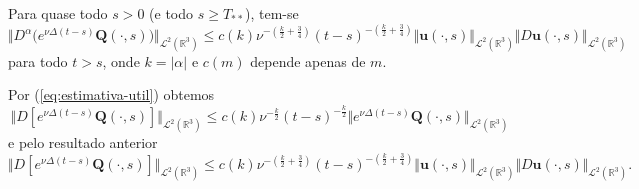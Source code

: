 \documentclass[a4paper, 11pt]{book}
\theoremstyle{definition}
\newcommand{\bR}{\mathbb{R}}
\newcommand{\bu}{\mathbf{u}}
\newcommand{\BQ}{\mathbf{Q}}
\newcommand{\cL}{\mathcal{L}}
\begin{document}
\begin{pbox}
    Para quase todo $s > 0$ (e todo $s \geqslant T_{**}$), tem-se
    \[
        \Vert D^{\alpha} \big( e^{\nu\Delta(t-s)}\BQ(\cdot,s)\big) \Vert_{\cL^2(\bR^3)} \leqslant c(k) \nu^{-\left( \frac{k}{2} + \frac{3}{4} \right)} (t - s)^{-\left( \frac{k}{2} + \frac{3}{4}\right)} \Vert \bu(\cdot,s) \Vert_{\cL^2(\bR^3)} \Vert D\bu(\cdot,s) \Vert_{\cL^2(\bR^3)}
    \]
    para todo $t > s$, onde $k = |\alpha|$ e $c(m)$ depende apenas de $m$.
\end{pbox}
\begin{prf}
    Por (\ref{eq:estimativa-util}) obtemos
    \[
        \Vert D [e^{\nu \Delta (t - s)} \BQ(\cdot,s)] \Vert_{\cL^2(\bR^3)} \leqslant c(k) \nu^{-\frac{k}{2}} (t - s)^{-\frac{k}{2}} \Vert e^{\nu\Delta(t-s)} \BQ(\cdot,s) \Vert_{\cL^2(\bR^3)}
    \]
    e pelo resultado anterior
    \[
        \Vert D [e^{\nu \Delta (t - s)} \BQ(\cdot,s)] \Vert_{\cL^2(\bR^3)} \leqslant c(k) \nu^{-\left( \frac{k}{2} + \frac{3}{4} \right)} (t - s)^{-\left( \frac{k}{2} + \frac{3}{4} \right)} \Vert \bu(\cdot,s) \Vert_{\cL^2(\bR^3)} \Vert D\bu(\cdot,s) \Vert_{\cL^2(\bR^3)}.
    \]
\end{prf}
\end{document}
